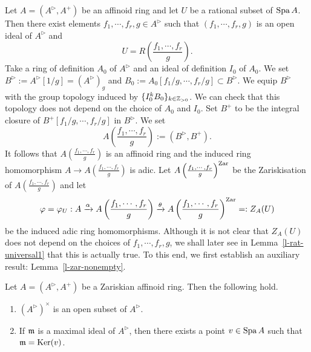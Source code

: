 Let $A=(A^{\rhd}, A^+)$ be an affinoid ring and 
let $U$ be a rational subset of ${\operatorname{Spa}}\,A$. 
Then there exist elements $f_1, \cdots, f_r, g \in A^{\rhd}$ such that 
$(f_1, \cdots, f_r, g)$ is an open ideal of $A^{\rhd}$ and 
$$U=R\left(\frac{f_1, \cdots, f_r}{g}\right).$$
Take a ring of definition $A_0$ of $A^{\rhd}$ 
and an ideal of definition $I_0$ of $A_0$. 
We set $B^{\rhd}:=A^{\rhd}[1/g]=(A^{\rhd})_g$ and  
$B_0:=A_0\left[f_1/g, \cdots, f_r/g\right] \subset B^{\rhd}.$ 
We equip $B^{\rhd}$ with the group topology induced by $\{I^k_0 B_0\}_{k \in \mathbb{Z}_{>0}}$. 
We can check that this topology does not depend on the choice 
of $A_0$ and $I_0$. 
Set $B^+$ to be the integral closure of 
$B^+[f_1/g, \cdots, f_r/g]$ in $B^{\rhd}$. 
We set 
$$A\left(\frac{f_1, \cdots, f_r}{g}\right):=(B^{\rhd}, B^+).$$
It follows that $A\left(\frac{f_1, \cdots, f_r}{g}\right)$ is 
an affinoid ring and the induced ring homomorphism 
$A \to A\left(\frac{f_1, \cdots, f_r}{g}\right)$ 
is adic. 
Let $A\left(\frac{f_1, \cdots, f_r}{g}\right)^{{\operatorname{Zar}}}$ be 
the Zariskisation of $A\left(\frac{f_1, \cdots, f_r}{g}\right)$ and 
let 
$$\varphi=\varphi_U:A \xrightarrow{\alpha} A\left(\frac{f_1, \cdots, f_r}{g}\right) 
\xrightarrow{\theta} A\left(\frac{f_1, \cdots, f_r}{g}\right)^{{\operatorname{Zar}}}=:Z_A(U)$$
be the induced adic ring homomorphisms. 
Although it is not clear that $Z_A(U)$ does not depend on the choices 
of $f_1, \cdots, f_r, g$, 
we shall later see in Lemma~\ref{l-rat-universal1} that this is actually true. 
To this end, we first establish an auxiliary result: 
Lemma~\ref{l-zar-nonempty}. 





\begin{lem}\label{l-zar-nonempty}
Let $A=(A^{\rhd}, A^+)$ be a Zariskian affinoid ring. 
Then the following hold. 
\begin{enumerate}
\item $(A^{\rhd})^{\times}$ is an open subset of $A^{\rhd}$. 
\item If $\mathfrak{m}$ is a maximal ideal of $A^{\rhd}$, 
then there exists a point $v \in {\operatorname{Spa}}\,A$ such that $\mathfrak{m}={\operatorname{Ker}}(v)$. 
\end{enumerate}
\end{lem}

